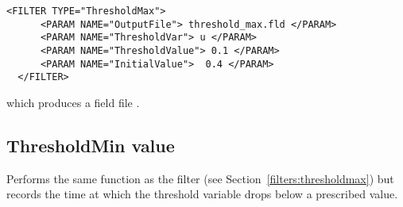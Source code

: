 \begin{lstlisting}[style=XMLStyle]
  <FILTER TYPE="ThresholdMax">
      <PARAM NAME="OutputFile"> threshold_max.fld </PARAM>
      <PARAM NAME="ThresholdVar"> u </PARAM>
      <PARAM NAME="ThresholdValue"> 0.1 </PARAM>
      <PARAM NAME="InitialValue">  0.4 </PARAM>
  </FILTER>
\end{lstlisting}

which produces a field file .

\subsection{ThresholdMin value}\label{filters:ThresholdMin}

Performs the same function as the  filter (see Section~\ref{filters:thresholdmax}) but records the
time at which the threshold variable drops below a prescribed value.
